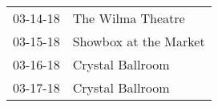 \begin{supertabular}{p{0.07\textwidth}p{0.23\textwidth}}
 03-14-18 &      The Wilma Theatre \\
 03-15-18 &  Showbox at the Market \\
 03-16-18 &       Crystal Ballroom \\
 03-17-18 &       Crystal Ballroom \\
\end{supertabular}
